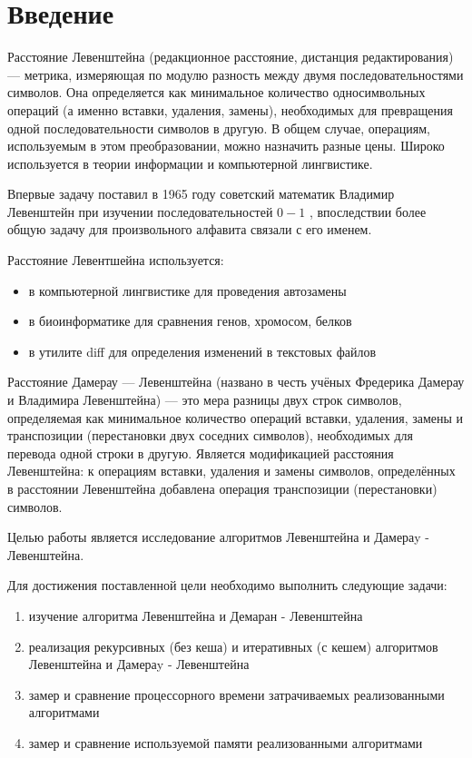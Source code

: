 \chapter*{Введение}

Расстояние Левенштейна (редакционное расстояние, дистанция редактирования) — метрика, измеряющая по модулю разность между двумя последовательностями символов. Она определяется как минимальное количество односимвольных операций (а именно вставки, удаления, замены), необходимых для превращения одной последовательности символов в другую. В общем случае, операциям, используемым в этом преобразовании, можно назначить разные цены. Широко используется в теории информации и компьютерной лингвистике.

Впервые задачу поставил в 1965 году советский математик Владимир Левенштейн при изучении последовательностей \(0 − 1\) \cite{leven1965}, впоследствии более общую задачу для произвольного алфавита связали с его именем.

Расстояние Левентшейна используется:

\begin{itemize}
    \item в компьютерной лингвистике для проведения автозамены
    \item в биоинформатике для сравнения генов, хромосом, белков
    \item в утилите diff для определения изменений в текстовых файлов
\end{itemize}

Расстояние Дамерау — Левенштейна (названо в честь учёных Фредерика Дамерау и Владимира Левенштейна) — это мера разницы двух строк символов, определяемая как минимальное количество операций вставки, удаления, замены и транспозиции (перестановки двух соседних символов), необходимых для перевода одной строки в другую. Является модификацией расстояния Левенштейна: к операциям вставки, удаления и замены символов, определённых в расстоянии Левенштейна добавлена операция транспозиции (перестановки) символов.

Целью работы является исследование алгоритмов Левенштейна и Дамераy - Левенштейна.

Для достижения поставленной цели необходимо выполнить следующие задачи:

\begin{enumerate}
    \item изучение алгоритма Левенштейна и Демаран - Левенштейна
    \item реализация рекурсивных (без кеша) и итеративных (с кешем) алгоритмов Левенштейна и Дамераy - Левенштейна
    \item замер и сравнение процессорного времени затрачиваемых реализованными алгоритмами
    \item замер и сравнение используемой памяти реализованными алгоритмами
\end{enumerate}
